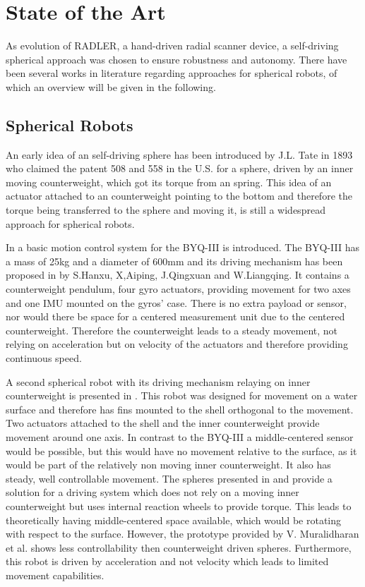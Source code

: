\section{State of the Art}
\label{sec:stateOfTheArt}
As evolution of RADLER, a hand-driven radial scanner device, a self-driving spherical approach was chosen to ensure robustness and autonomy.  There have been several works in literature regarding approaches for spherical robots, of which an overview will be given in the following. 

\subsection{Spherical Robots}
\label{sec:stateOfTheArt:sphericalrobots}
An early idea of an self-driving sphere has been introduced by J.L. Tate in 1893 who claimed the patent  508 and 558 in  the U.S. for a sphere, driven by an inner moving counterweight, which got its torque from an spring. This idea of an actuator attached to an counterweight pointing to the bottom and therefore the torque being transferred to the sphere and moving it, is still a widespread approach for spherical robots.

In \cite{soa1} a basic motion control system for the BYQ-III is introduced. The BYQ-III has a mass of 25kg and a diameter of 600mm and its driving mechanism has been proposed in \cite{soa2} by S.Hanxu, X,Aiping, J.Qingxuan and W.Liangqing. It contains  a counterweight pendulum, four gyro actuators, providing movement for two axes and one IMU mounted on the gyros' case. There is no extra payload or sensor, nor would there be space for a centered measurement unit due to the centered counterweight. Therefore the counterweight leads to a steady movement, not relying on acceleration but on velocity of the actuators and therefore providing continuous speed.

A second spherical robot with its driving mechanism relaying on inner counterweight is presented in \cite{soa3}. This robot was designed for movement on a water surface and therefore has fins mounted to the shell orthogonal to the movement. Two actuators attached to the shell and the inner counterweight provide movement around one axis. In contrast to the BYQ-III a middle-centered  sensor would be possible, but this would have no movement relative to the surface, as it would be part of the relatively non moving inner counterweight. It also has steady, well controllable movement. 
The spheres presented in \cite{soa4} and \cite{soa5} provide a solution for a driving system which does not rely on a moving inner counterweight but uses internal reaction wheels to provide torque. This leads to theoretically having middle-centered space available, which would be rotating with respect to the surface. However, the prototype provided by V. Muralidharan et al. shows less controllability then counterweight driven spheres. Furthermore, this robot is driven by acceleration and not velocity which leads to limited movement capabilities.

